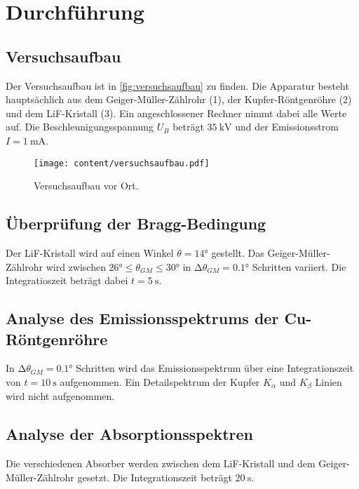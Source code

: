 \section{Durchführung}
\label{sec:Durchführung}

\subsection{Versuchsaufbau}
\label{subsec:Versuchsaufbau}
Der Versuchsaufbau ist in \autoref{fig:versuchsaufbau} zu finden.
Die Apparatur besteht hauptsächlich aus dem Geiger-Müller-Zählrohr (1), der Kupfer-Röntgenröhre (2)
und dem LiF-Kristall (3).
Ein angeschlossener Rechner nimmt dabei alle Werte auf.
Die Beschleunigungsspannung $U_B$ beträgt $\SI{35}{\kilo\volt}$ und der Emissionsstrom $I = \SI{1}{\milli\ampere}$.

\begin{figure}
    \centering
    \texttt{[image: content/versuchsaufbau.pdf]}
    \caption{Versuchsaufbau vor Ort.\cite{anleitung}}
    \label{fig:versuchsaufbau}
\end{figure}

\subsection{Überprüfung der Bragg-Bedingung}
\label{subsec:braggbedingung}
Der LiF-Kristall wird auf einen Winkel $\theta = 14°$ gestellt.
Das Geiger-Müller-Zählrohr wird zwischen $26° \leq \theta_{GM} \leq 30°$ in $\increment \theta_{GM} = 0.1°$ Schritten variiert.
Die Integratioszeit beträgt dabei $t = \SI{5}{\second}$.

\subsection{Analyse des Emissionsspektrums der Cu-Röntgenröhre}
\label{subsec:emissionspektrum}
In $\increment \theta_{GM} = 0.1°$ Schritten wird das Emissionsspektrum über eine Integrationszeit von $t = \SI{10}{\second}$ aufgenommen.
Ein Detailspektrum der Kupfer $K_\alpha$  und $K_\beta$ Linien wird nicht aufgenommen.

\subsection{Analyse der Absorptionsspektren}
\label{subsec:absorptionsspektren}
Die verschiedenen Absorber werden zwischen dem LiF-Kristall und dem Geiger-Müller-Zählrohr gesetzt.
Die Integrationszeit beträgt $\SI{20}{\second}$.
